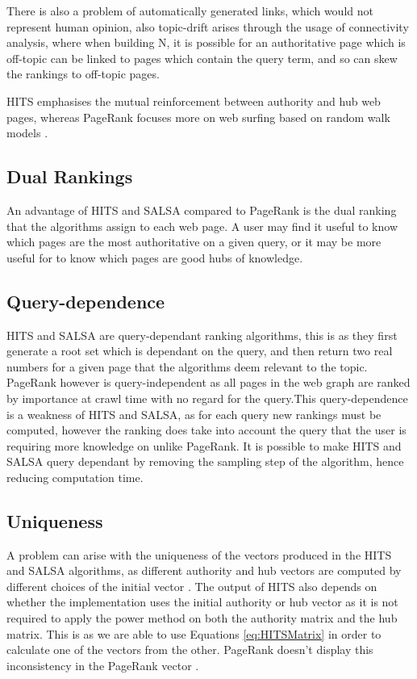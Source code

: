 \documentclass[11pt]{report}
\begin{document}
There is also a problem of automatically generated links, which would not represent human opinion, also topic-drift arises through the usage of connectivity analysis, where when building N, it is possible for an authoritative page which is off-topic can be linked to pages which contain the query term, and so can skew the rankings to off-topic pages.  

HITS emphasises the mutual reinforcement between authority and hub web pages, whereas PageRank focuses more on web surfing based on random walk models \cite{ding2003pagerank}.


\subsection*{Dual Rankings}
An advantage of HITS and SALSA compared to PageRank is the dual ranking that the algorithms assign to each web page. A user may find it useful to know which pages are the most authoritative on a given query, or it may be more useful for to know which pages are good hubs of knowledge.

\subsection*{Query-dependence}
HITS and SALSA are query-dependant ranking algorithms, this is as they first generate a root set which is dependant on the query, and then return two real numbers for a given page that the algorithms deem relevant to the topic. PageRank however is query-independent as all pages in the web graph are ranked by importance at crawl time with no regard for the query.This query-dependence is a weakness of HITS and SALSA, as for each query new rankings must be computed, however the ranking does take into account the query that the user is requiring more knowledge on unlike PageRank. It is possible to make HITS and SALSA query dependant by removing the sampling step of the algorithm, hence reducing computation time. 

\subsection*{Uniqueness}
A problem can arise with the uniqueness of the vectors produced in the HITS and SALSA algorithms, as different authority and hub vectors are computed by different choices of the initial vector \cite{langville}. The output of HITS also depends on whether the implementation uses the initial authority or hub vector as it is not required to apply the power method on both the authority matrix and the hub matrix. This is as we are able to use Equations \eqref{eq:HITSMatrix} in order to calculate one of the vectors from the other. PageRank doesn't display this inconsistency in the PageRank vector \cite{farahat2006authority}. 
\end{document}
